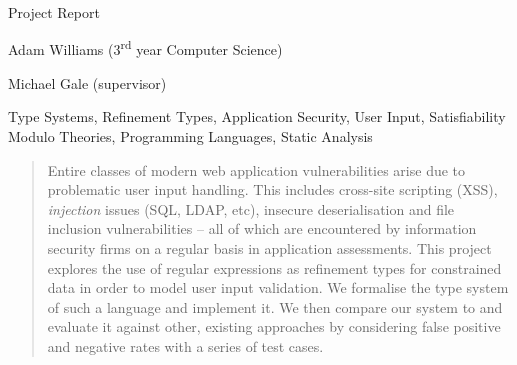 \documentclass[a4paper,openany,12pt]{book}
\begin{document}
\begin{titlepage}
{}
    
    {\par}
    \vspace{1.25cm}
    \vspace{3.5cm}
    {\hspace{0.75cm}\Huge \warwickfont Project Report}
    \vspace{0.16cm}
    {\par}
    {\hspace{0.75cm}\large \warwickfont Adam Williams (3\textsuperscript{rd} year Computer Science)}


    {\hspace{0.75cm}\large \warwickfont Michael Gale (supervisor)}
    \vfill
\end{titlepage}
\restoregeometry
\restorepagecolor

\tableofcontents
\pagebreak[5]
\begin{keywords}
    Type Systems, Refinement Types, Application Security, User Input, Satisfiability Modulo Theories,
    Programming Languages, Static Analysis
\end{keywords}

\vspace{0.5em}

\begin{abstract}
    Entire classes of modern web application vulnerabilities arise due to problematic user input handling.
    This includes cross-site scripting (XSS), \emph{injection} issues (SQL, LDAP, etc), insecure deserialisation and
    file inclusion vulnerabilities – all of which are encountered by information security firms on a regular basis in application assessments.
    This project explores the use of regular expressions as refinement types for constrained data in order to model user input validation.
    We formalise the type system of such a language and implement it.
    We then compare our system to and evaluate it against other, existing approaches by considering false positive and negative rates with a series of test cases.
\end{abstract}
\titlespacing*{\chapter}
{0pt}{0pt}{2.0ex}
\end{document}
